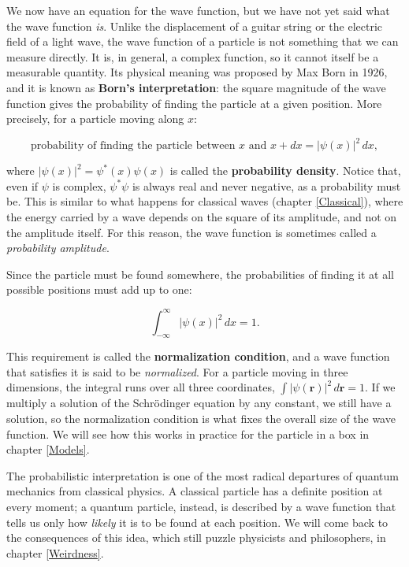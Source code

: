 \documentclass[
  english,
  9pt,
]{extbook}
\theoremstyle{definition}
\theoremstyle{definition}
\theoremstyle{definition}
\theoremstyle{definition}
\theoremstyle{remark}
\begin{document}
We now have an equation for the wave function, but we have not yet said what the wave function \emph{is}. Unlike the displacement of a guitar string or the electric field of a light wave, the wave function of a particle is not something that we can measure directly. It is, in general, a complex function, so it cannot itself be a measurable quantity. Its physical meaning was proposed by Max Born in 1926, and it is known as \textbf{Born's interpretation}: the square magnitude of the wave function gives the probability of finding the particle at a given position. More precisely, for a particle moving along \(x\):

\begin{equation}
\text{probability of finding the particle between } x \text{ and } x+dx = |\psi(x)|^2\,dx,
\label{eq:born1}
\end{equation}

where \(|\psi(x)|^2=\psi^*(x)\psi(x)\) is called the \textbf{probability density}. Notice that, even if \(\psi\) is complex, \(\psi^*\psi\) is always real and never negative, as a probability must be. This is similar to what happens for classical waves (chapter \ref{Classical}), where the energy carried by a wave depends on the square of its amplitude, and not on the amplitude itself. For this reason, the wave function is sometimes called a \emph{probability amplitude}.

Since the particle must be found somewhere, the probabilities of finding it at all possible positions must add up to one:

\begin{equation}
\int_{-\infty}^{\infty} |\psi(x)|^2\,dx = 1.
\label{eq:born2}
\end{equation}

This requirement is called the \textbf{normalization condition}, and a wave function that satisfies it is said to be \emph{normalized}. For a particle moving in three dimensions, the integral runs over all three coordinates, \(\int |\psi(\mathbf{r})|^2\,d\mathbf{r}=1\). If we multiply a solution of the Schrödinger equation by any constant, we still have a solution, so the normalization condition is what fixes the overall size of the wave function. We will see how this works in practice for the particle in a box in chapter \ref{Models}.

The probabilistic interpretation is one of the most radical departures of quantum mechanics from classical physics. A classical particle has a definite position at every moment; a quantum particle, instead, is described by a wave function that tells us only how \emph{likely} it is to be found at each position. We will come back to the consequences of this idea, which still puzzle physicists and philosophers, in chapter \ref{Weirdness}.
\end{document}
